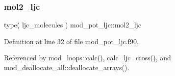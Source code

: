 \subsubsection{\texorpdfstring{mol2\+\_\+ljc}{mol2\_ljc}}
{\footnotesize\ttfamily type( ljc\+\_\+molecules ) mod\+\_\+pot\+\_\+ljc\+::mol2\+\_\+ljc}



Definition at line 32 of file mod\+\_\+pot\+\_\+ljc.\+f90.



Referenced by mod\+\_\+loops\+::calc(), calc\+\_\+ljc\+\_\+cross(), and mod\+\_\+deallocate\+\_\+all\+::deallocate\+\_\+arrays().

